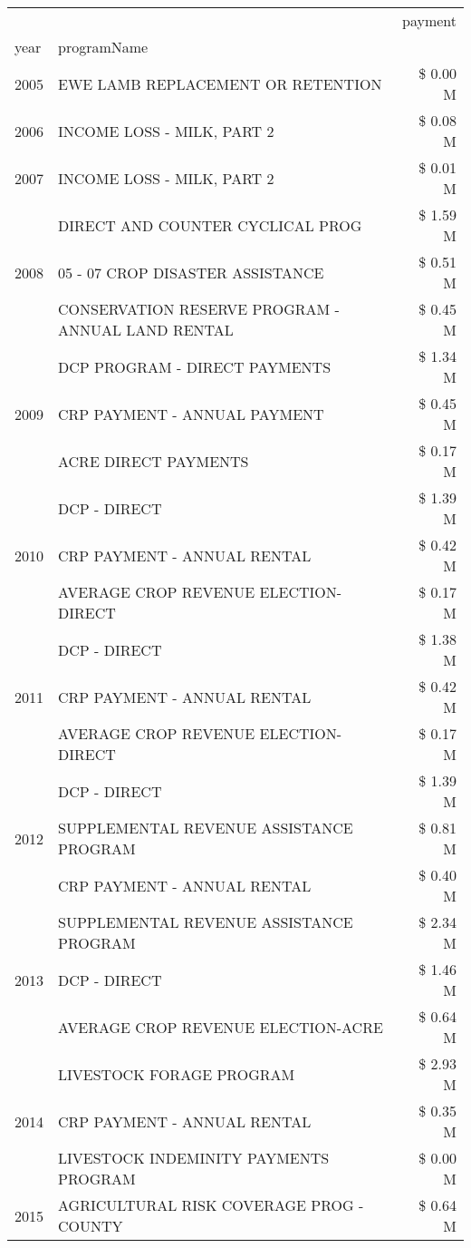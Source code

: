 \begin{tabular}{llr}
\toprule
 &  & payment \\
year & programName &  \\
\midrule
2005 & EWE LAMB REPLACEMENT OR RETENTION & \$ 0.00 M \\
\cline{1-3}
2006 & INCOME LOSS - MILK, PART 2 & \$ 0.08 M \\
\cline{1-3}
2007 & INCOME LOSS - MILK, PART 2 & \$ 0.01 M \\
\cline{1-3}
\multirow[t]{3}{*}{2008} & DIRECT AND COUNTER CYCLICAL PROG & \$ 1.59 M \\
 & 05 - 07 CROP DISASTER ASSISTANCE & \$ 0.51 M \\
 & CONSERVATION RESERVE PROGRAM - ANNUAL LAND RENTAL & \$ 0.45 M \\
\cline{1-3}
\multirow[t]{3}{*}{2009} & DCP PROGRAM - DIRECT PAYMENTS & \$ 1.34 M \\
 & CRP PAYMENT - ANNUAL PAYMENT & \$ 0.45 M \\
 & ACRE DIRECT PAYMENTS & \$ 0.17 M \\
\cline{1-3}
\multirow[t]{3}{*}{2010} & DCP - DIRECT & \$ 1.39 M \\
 & CRP PAYMENT - ANNUAL RENTAL & \$ 0.42 M \\
 & AVERAGE CROP REVENUE ELECTION-DIRECT & \$ 0.17 M \\
\cline{1-3}
\multirow[t]{3}{*}{2011} & DCP - DIRECT & \$ 1.38 M \\
 & CRP PAYMENT - ANNUAL RENTAL & \$ 0.42 M \\
 & AVERAGE CROP REVENUE ELECTION-DIRECT & \$ 0.17 M \\
\cline{1-3}
\multirow[t]{3}{*}{2012} & DCP - DIRECT & \$ 1.39 M \\
 & SUPPLEMENTAL REVENUE ASSISTANCE PROGRAM & \$ 0.81 M \\
 & CRP PAYMENT - ANNUAL RENTAL & \$ 0.40 M \\
\cline{1-3}
\multirow[t]{3}{*}{2013} & SUPPLEMENTAL REVENUE ASSISTANCE PROGRAM & \$ 2.34 M \\
 & DCP - DIRECT & \$ 1.46 M \\
 & AVERAGE CROP REVENUE ELECTION-ACRE & \$ 0.64 M \\
\cline{1-3}
\multirow[t]{3}{*}{2014} & LIVESTOCK FORAGE PROGRAM & \$ 2.93 M \\
 & CRP PAYMENT - ANNUAL RENTAL & \$ 0.35 M \\
 & LIVESTOCK INDEMINITY PAYMENTS PROGRAM & \$ 0.00 M \\
\cline{1-3}
\multirow[t]{3}{*}{2015} & AGRICULTURAL RISK COVERAGE PROG - COUNTY & \$ 0.64 M \\

\end{tabular}
